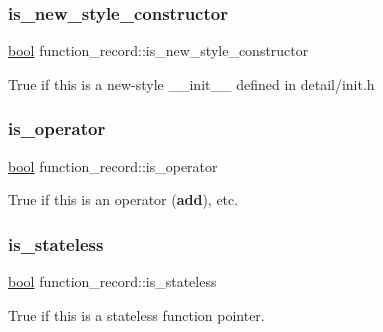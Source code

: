 \mbox{\label{structfunction__record_a2a002c9d435634209613d4be9f3d5d7c}} 
\subsubsection{\texorpdfstring{is\_new\_style\_constructor}{is\_new\_style\_constructor}}
{\footnotesize\ttfamily \mbox{\hyperlink{asdl_8h_af6a258d8f3ee5206d682d799316314b1}{bool}} function\+\_\+record\+::is\+\_\+new\+\_\+style\+\_\+constructor}



True if this is a new-\/style {\ttfamily \+\_\+\+\_\+init\+\_\+\+\_\+} defined in {\ttfamily detail/init.\+h} 

\mbox{\label{structfunction__record_ab57608549c3d2c71771feda7808a2595}} 
\subsubsection{\texorpdfstring{is\_operator}{is\_operator}}
{\footnotesize\ttfamily \mbox{\hyperlink{asdl_8h_af6a258d8f3ee5206d682d799316314b1}{bool}} function\+\_\+record\+::is\+\_\+operator}



True if this is an operator ({\bfseries{add}}), etc. 

\mbox{\label{structfunction__record_abdee0c594dc06ef0b4d4b136255ea971}} 
\subsubsection{\texorpdfstring{is\_stateless}{is\_stateless}}
{\footnotesize\ttfamily \mbox{\hyperlink{asdl_8h_af6a258d8f3ee5206d682d799316314b1}{bool}} function\+\_\+record\+::is\+\_\+stateless}



True if this is a stateless function pointer. 

